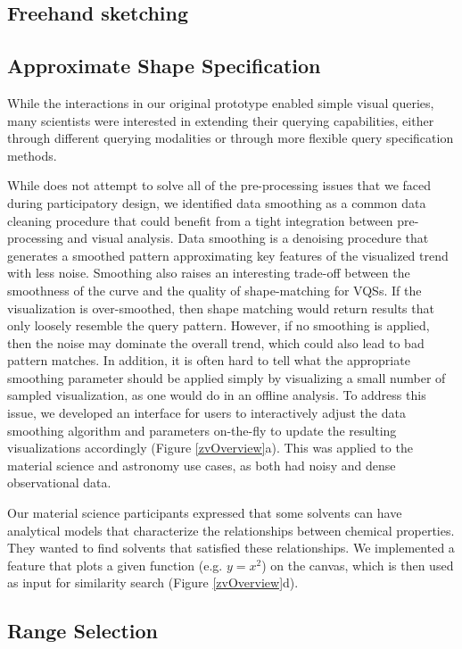 \subsection{Freehand sketching}
\subsection{Approximate Shape Specification}
While the interactions in our original prototype enabled simple visual queries, many scientists were interested in extending their querying capabilities, either through different querying modalities or through more flexible query specification methods.

 While \zv does not attempt to solve all of the pre-processing issues that we faced during participatory design, we identified data smoothing as a common data cleaning procedure that could benefit from a tight integration between pre-processing and visual analysis. Data smoothing is a denoising procedure that generates a smoothed pattern approximating key features of the visualized trend with less noise. Smoothing also raises an interesting trade-off between the smoothness of the curve and the quality of shape-matching for VQSs. If the visualization is over-smoothed, then shape matching would return results that only loosely resemble the query pattern. However, if no smoothing is applied, then the noise may dominate the overall trend, which could also lead to bad pattern matches. In addition, it is often hard to tell what the appropriate smoothing parameter should be applied simply by visualizing a small number of sampled visualization, as one would do in an offline analysis.
\npar To address this issue, we developed an interface for users to interactively adjust the data smoothing algorithm and parameters on-the-fly to update the resulting visualizations accordingly (Figure \ref{zvOverview}a). This was applied to the material science and astronomy use cases, as both had noisy and dense observational data.

 Our material science participants expressed that some solvents can have analytical models that characterize the relationships between chemical properties. They wanted to find solvents that satisfied these relationships. We implemented a feature that plots a given function (e.g. $y=x^2$) on the canvas, which is then used as input for similarity search (Figure \ref{zvOverview}d).

\subsection{Range Selection}
